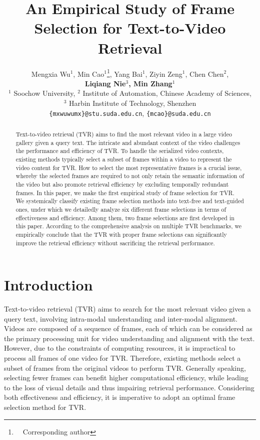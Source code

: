 \documentclass[11pt]{article}
\title{An Empirical Study of Frame Selection for Text-to-Video Retrieval}
\author{
  Mengxia Wu$^1$, Min Cao$^1$\thanks{\ \ Corresponding author}, Yang Bai$^1$, Ziyin Zeng$^1$, Chen Chen$^2$,\\
  \textbf{ Liqiang Nie$^3$, Min Zhang$^1$}\\
  $^1$ Soochow University, $^2$ Institute of Automation, Chinese Academy of Sciences, \\
  $^3$ Harbin Institute of Technology, Shenzhen \\
   \texttt{\{mxwuwumx\}@stu.suda.edu.cn}, \texttt{\{mcao\}@suda.edu.cn}
  \\
}
\begin{document}
\maketitle
\begin{abstract}
Text-to-video retrieval (TVR) aims to find the most relevant video in a large video gallery given a query text.
The intricate and abundant context of the video challenges the performance and efficiency of TVR.
To handle the serialized video contexts, existing methods typically select a subset of frames within a video to represent the video content for TVR.
How to select the most representative frames is a crucial issue, whereby the selected frames are required to not only retain the semantic information of the video but also promote retrieval efficiency by excluding temporally redundant frames.
In this paper, we make the first empirical study of frame selection for TVR.
We systemically classify existing frame selection methods into text-free and text-guided ones, under which we detailedly analyze six different frame selections in terms of effectiveness and efficiency.
Among them, two frame selections are first developed in this paper.
According to the comprehensive analysis on multiple TVR benchmarks, we empirically conclude that the TVR with proper frame selections can significantly improve the retrieval efficiency without sacrificing the retrieval performance.
\end{abstract}

\section{Introduction}

Text-to-video retrieval (TVR) aims to search for the most relevant video given a query text, involving intra-modal understanding and inter-modal alignment.
Videos are composed of a sequence of frames, each of which can be considered as the primary processing unit for video understanding and alignment with the text.
However, due to the constraints of computing resources, it is impractical to process all frames of one video for TVR.
Therefore, existing methods \cite{liu2019use, gabeur2020multi, lei2021less, luo2022clip4clip} select a subset of frames from the original videos to perform TVR.
Generally speaking, selecting fewer frames can benefit higher computational efficiency, while leading to the loss of visual details and thus impairing retrieval performance.
Considering both effectiveness and efficiency, it is imperative to adopt an optimal frame selection method for TVR.
\end{document}
